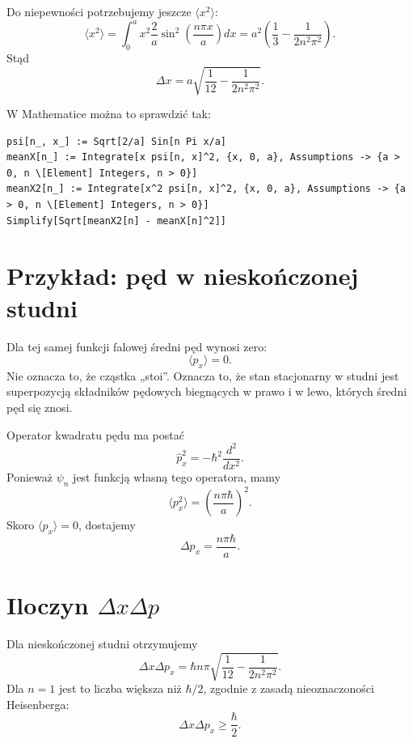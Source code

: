 Do niepewności potrzebujemy jeszcze \(\langle x^2\rangle\):
\begin{equation}
    \langle x^2\rangle
    =\int_0^a x^2\frac{2}{a}\sin^2\left(\frac{n\pi x}{a}\right)dx
    =a^2\left(\frac{1}{3}-\frac{1}{2n^2\pi^2}\right).
\end{equation}
Stąd
\begin{equation}
    \Delta x
    =a\sqrt{\frac{1}{12}-\frac{1}{2n^2\pi^2}}.
\end{equation}

W Mathematice można to sprawdzić tak:
\begin{verbatim}
psi[n_, x_] := Sqrt[2/a] Sin[n Pi x/a]
meanX[n_] := Integrate[x psi[n, x]^2, {x, 0, a}, Assumptions -> {a > 0, n \[Element] Integers, n > 0}]
meanX2[n_] := Integrate[x^2 psi[n, x]^2, {x, 0, a}, Assumptions -> {a > 0, n \[Element] Integers, n > 0}]
Simplify[Sqrt[meanX2[n] - meanX[n]^2]]
\end{verbatim}

\section{Przykład: pęd w nieskończonej studni}

Dla tej samej funkcji falowej średni pęd wynosi zero:
\begin{equation}
    \langle p_x\rangle=0.
\end{equation}
Nie oznacza to, że cząstka „stoi”. Oznacza to, że stan stacjonarny w studni jest superpozycją składników pędowych biegnących w prawo i w lewo, których średni pęd się znosi.

Operator kwadratu pędu ma postać
\begin{equation}
    \hat{p}_x^2=-\hbar^2\frac{d^2}{dx^2}.
\end{equation}
Ponieważ \(\psi_n\) jest funkcją własną tego operatora, mamy
\begin{equation}
    \langle p_x^2\rangle=\left(\frac{n\pi\hbar}{a}\right)^2.
\end{equation}
Skoro \(\langle p_x\rangle=0\), dostajemy
\begin{equation}
    \Delta p_x=\frac{n\pi\hbar}{a}.
\end{equation}

\section{Iloczyn \texorpdfstring{\(\Delta x\Delta p\)}{Delta x Delta p}}

Dla nieskończonej studni otrzymujemy
\begin{equation}
    \Delta x\Delta p_x
    =\hbar n\pi\sqrt{\frac{1}{12}-\frac{1}{2n^2\pi^2}}.
\end{equation}
Dla \(n=1\) jest to liczba większa niż \(\hbar/2\), zgodnie z zasadą nieoznaczoności Heisenberga:
\begin{equation}
    \Delta x\Delta p_x\geq \frac{\hbar}{2}.
\end{equation}

